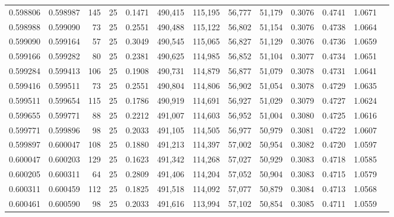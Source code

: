 \begin{tabular}{rrrrrrrrrrrrr}
0.598806 & 0.598987 &   145 &  25 &                                     0.1471 & 490,415 & 115,195 &  56,777 &  51,179 & 0.3076 & 0.4741 & 1.0671 \\
0.598988 & 0.599090 &    73 &  25 &                                     0.2551 & 490,488 & 115,122 &  56,802 &  51,154 & 0.3076 & 0.4738 & 1.0664 \\
0.599090 & 0.599164 &    57 &  25 &                                     0.3049 & 490,545 & 115,065 &  56,827 &  51,129 & 0.3076 & 0.4736 & 1.0659 \\
0.599166 & 0.599282 &    80 &  25 &                                     0.2381 & 490,625 & 114,985 &  56,852 &  51,104 & 0.3077 & 0.4734 & 1.0651 \\
0.599284 & 0.599413 &   106 &  25 &                                     0.1908 & 490,731 & 114,879 &  56,877 &  51,079 & 0.3078 & 0.4731 & 1.0641 \\
0.599416 & 0.599511 &    73 &  25 &                                     0.2551 & 490,804 & 114,806 &  56,902 &  51,054 & 0.3078 & 0.4729 & 1.0635 \\
0.599511 & 0.599654 &   115 &  25 &                                     0.1786 & 490,919 & 114,691 &  56,927 &  51,029 & 0.3079 & 0.4727 & 1.0624 \\
0.599655 & 0.599771 &    88 &  25 &                                     0.2212 & 491,007 & 114,603 &  56,952 &  51,004 & 0.3080 & 0.4725 & 1.0616 \\
0.599771 & 0.599896 &    98 &  25 &                                     0.2033 & 491,105 & 114,505 &  56,977 &  50,979 & 0.3081 & 0.4722 & 1.0607 \\
0.599897 & 0.600047 &   108 &  25 &                                     0.1880 & 491,213 & 114,397 &  57,002 &  50,954 & 0.3082 & 0.4720 & 1.0597 \\
0.600047 & 0.600203 &   129 &  25 &                                     0.1623 & 491,342 & 114,268 &  57,027 &  50,929 & 0.3083 & 0.4718 & 1.0585 \\
0.600205 & 0.600311 &    64 &  25 &                                     0.2809 & 491,406 & 114,204 &  57,052 &  50,904 & 0.3083 & 0.4715 & 1.0579 \\
0.600311 & 0.600459 &   112 &  25 &                                     0.1825 & 491,518 & 114,092 &  57,077 &  50,879 & 0.3084 & 0.4713 & 1.0568 \\
0.600461 & 0.600590 &    98 &  25 &                                     0.2033 & 491,616 & 113,994 &  57,102 &  50,854 & 0.3085 & 0.4711 & 1.0559 \\

\end{tabular}
